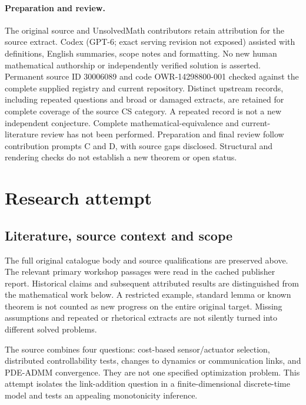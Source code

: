 \documentclass[11pt]{article}
\begin{document}
\paragraph{Preparation and review.}
The original source and UnsolvedMath contributors retain attribution for the source extract. Codex (GPT-6; exact serving revision not exposed) assisted with definitions, English summaries, scope notes and formatting. No new human mathematical authorship or independently verified solution is asserted. Permanent source ID 30006089 and code OWR-14298800-001 checked against the complete supplied registry and current repository. Distinct upstream records, including repeated questions and broad or damaged extracts, are retained for complete coverage of the source CS category. A repeated record is not a new independent conjecture. Complete mathematical-equivalence and current-literature review has not been performed. Preparation and final review follow contribution prompts C and D, with source gaps disclosed. Structural and rendering checks do not establish a new theorem or open status.
\label{end:30006089}

\section{Research attempt}
\subsection{Literature, source context and scope}
The full original catalogue body and source qualifications are preserved above. The relevant primary workshop passages were read in the cached publisher report. Historical claims and subsequent attributed results are distinguished from the mathematical work below. A restricted example, standard lemma or known theorem is not counted as new progress on the entire original target. Missing assumptions and repeated or rhetorical extracts are not silently turned into different solved problems.

The source combines four questions: cost-based sensor/actuator selection, distributed controllability tests, changes to dynamics or communication links, and PDE-ADMM convergence. They are not one specified optimization problem. This attempt isolates the link-addition question in a finite-dimensional discrete-time model and tests an appealing monotonicity inference.
\end{document}
